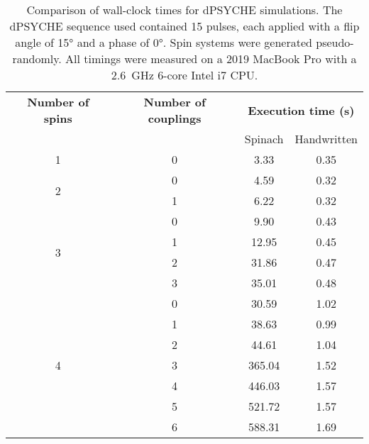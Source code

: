 \begin{table}[htb]
    \begin{tabular}{cccc}
        \toprule
        \textbf{Number of spins} & \textbf{Number of couplings} & \multicolumn{2}{c}{\textbf{Execution time (s)}} \\
        \cmidrule{3-4}
                                 & & Spinach & Handwritten \\
                                 \midrule
        \multirow{1}{*}{1}       & 0 & 3.33 & 0.35 \\
        \midrule
        \multirow{2}{*}{2}       & 0 & 4.59 & 0.32 \\
                                 & 1 & 6.22 & 0.32 \\
                                 \midrule
        \multirow{4}{*}{3}       & 0 & 9.90  & 0.43 \\
                                 & 1 & 12.95 & 0.45 \\
                                 & 2 & 31.86 & 0.47 \\
                                 & 3 & 35.01 & 0.48 \\
                                 \midrule
        \multirow{7}{*}{4}       & 0 & 30.59  & 1.02 \\
                                 & 1 & 38.63  & 0.99 \\
                                 & 2 & 44.61  & 1.04 \\
                                 & 3 & 365.04 & 1.52 \\
                                 & 4 & 446.03 & 1.57 \\
                                 & 5 & 521.72 & 1.57 \\
                                 & 6 & 588.31 & 1.69 \\
        \bottomrule
    \end{tabular}
    \caption[Comparison of wall-clock times for dPSYCHE simulations]{
        Comparison of wall-clock times for dPSYCHE simulations.
        The dPSYCHE sequence used contained 15 pulses, each applied with a flip angle of \ang{15} and a phase of \ang{0}.
        Spin systems were generated pseudo-randomly.
        All timings were measured on a 2019 MacBook Pro with a \qty{2.6}{\GHz} 6-core Intel i7 CPU.
    }
    \label{tbl:dpsyche_simulations}
\end{table}
